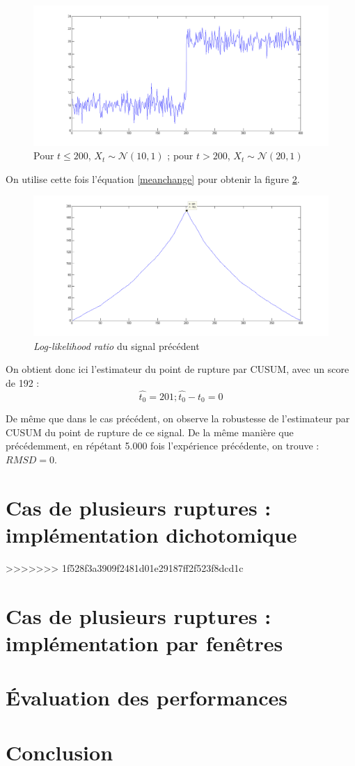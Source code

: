 \documentclass[french,12pt,notitlepage]{report}
\begin{document}
	\begin{figure}[h]
		\includegraphics[scale=0.4]{test_signal_mean.png}
		\caption{Pour $t \leq 200$, $X_t \sim \mathcal{N}(10, 1)$ ; pour $t > 200$, $X_t \sim \mathcal{N}(20, 1)$}
		\label{test_signal_mean}
	\end{figure}
	
	On utilise cette fois l'équation \ref{meanchange} pour obtenir la figure \ref{llr_test_mean}.
	
	\begin{figure}[h]
		\includegraphics[scale=0.4]{llr_test_mean.png}
		\caption{\textit{Log-likelihood ratio} du signal précédent}
		\label{llr_test_mean}
	\end{figure}
	
	On obtient donc ici l'estimateur du point de rupture par CUSUM, avec un score de 192 :
	\begin{equation*}
		\hat{t_0} = 201 ; \hat{t_0} - t_0 = 0
	\end{equation*}
	
	De même que dans le cas précédent, on observe la robustesse de l'estimateur par CUSUM du point de rupture de ce signal. De la même manière que précédemment, en répétant 5.000 fois l'expérience précédente, on trouve : $RMSD = 0$.
	
	\chapter{Cas de plusieurs ruptures : implémentation dichotomique}
>>>>>>> 1f528f3a3909f2481d01e29187ff2f523f8dcd1c
	
	\chapter{Cas de plusieurs ruptures : implémentation par fenêtres}
	
	\chapter{Évaluation des performances}
	
	\chapter{Conclusion}
\end{document}

